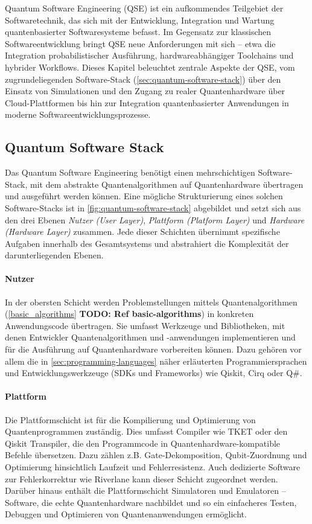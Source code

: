 Quantum Software Engineering (QSE) ist ein aufkommendes Teilgebiet der Softwaretechnik, das sich mit der Entwicklung, Integration und Wartung quantenbasierter Softwaresysteme befasst. Im Gegensatz zur klassischen Softwareentwicklung bringt QSE neue Anforderungen mit sich – etwa die Integration probabilistischer Ausführung, hardwareabhängiger Toolchains und hybrider Workflows. \autocite{TODO:Quantum-Based Software Engineering} Dieses Kapitel beleuchtet zentrale Aspekte der QSE, vom zugrundeliegenden Software-Stack (\autoref{sec:quantum-software-stack}) über den Einsatz von Simulationen und den Zugang zu realer Quantenhardware über Cloud-Plattformen bis hin zur Integration quantenbasierter Anwendungen in moderne Softwareentwicklungsprozesse.


\subsection{Quantum Software Stack}
\label{sec:quantum-software-stack}

Das Quantum Software Engineering benötigt einen mehrschichtigen Software-Stack, mit dem abstrakte Quantenalgorithmen auf Quantenhardware übertragen und ausgeführt werden können. Eine mögliche Strukturierung eines solchen Software-Stacks ist in \autoref{fig:quantum-software-stack} abgebildet und setzt sich aus den drei Ebenen \emph{Nutzer (User Layer)}, \emph{Plattform (Platform Layer)} und \emph{Hardware (Hardware Layer)} zusammen. Jede dieser Schichten übernimmt spezifische Aufgaben innerhalb des Gesamtsystems und abstrahiert die Komplexität der darunterliegenden Ebenen.
\\
\paragraph{Nutzer}  
In der obersten Schicht werden Problemstellungen mittels Quantenalgorithmen (\autoref{basic_algorithms} \textbf{TODO: Ref basic-algorithms}) in konkreten Anwendungscode übertragen. Sie umfasst Werkzeuge und Bibliotheken, mit denen Entwickler Quantenalgorithmen und -anwendungen implementieren und für die Ausführung auf Quantenhardware vorbereiten können. Dazu gehören vor allem die in \autoref{sec:programming-languages} näher erläuterten Programmiersprachen und Entwicklungswerkzeuge (SDKs und Frameworks) wie Qiskit, Cirq oder Q\#.
\\
\paragraph{Plattform}  
Die Plattformschicht ist für die Kompilierung und Optimierung von Quantenprogrammen zuständig. Dies umfasst Compiler wie TKET oder den Qiskit Transpiler, die den Programmcode in Quantenhardware-kompatible Befehle übersetzen. Dazu zählen z.B. Gate-Dekomposition, Qubit-Zuordnung und Optimierung hinsichtlich Laufzeit und Fehlerresistenz. Auch dedizierte Software zur Fehlerkorrektur wie Riverlane kann dieser Schicht zugeordnet werden. Darüber hinaus enthält die Plattformschicht Simulatoren und Emulatoren -- Software, die echte Quantenhardware nachbildet und so ein einfacheres Testen, Debuggen und Optimieren von Quantenanwendungen ermöglicht.
\\
